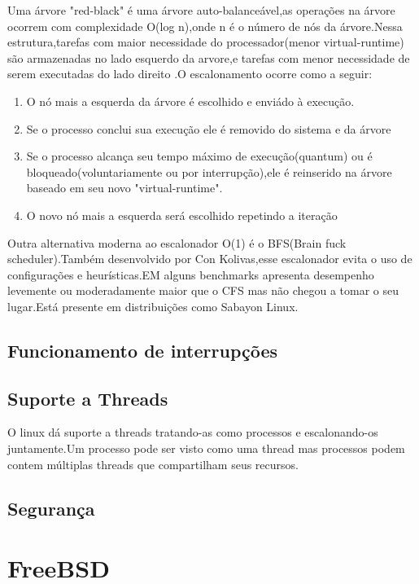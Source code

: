 \documentclass[conference]{IEEEtran}
\begin{document}
Uma árvore "red-black" é uma árvore auto-balanceável,as operações na árvore ocorrem com complexidade O(log n),onde n é o número de nós da árvore.Nessa estrutura,tarefas com maior necessidade do processador(menor virtual-runtime) são armazenadas no lado esquerdo da arvore,e tarefas com menor necessidade de serem executadas do lado direito \cite{LinuxSchedulerIBM}.O escalonamento ocorre como a seguir:
\begin{enumerate}
	\item O nó mais a esquerda da árvore é escolhido e enviádo à execução.
	\item Se o processo conclui sua execução ele é removido do sistema e da árvore
	\item Se o processo alcança seu tempo máximo de execução(quantum) ou é bloqueado(voluntariamente ou por interrupção),ele é reinserido na árvore baseado em seu novo "virtual-runtime".
	\item O novo nó mais a esquerda será escolhido repetindo a iteração\cite{LinuxSchedulerWiki}
\end{enumerate}



Outra alternativa moderna ao escalonador O(1) é o BFS(Brain fuck scheduler).Também desenvolvido por Con Kolivas,esse escalonador evita o uso de configurações e heurísticas.EM alguns benchmarks apresenta desempenho levemente ou moderadamente maior que o CFS mas não chegou a tomar o seu lugar.Está presente em distribuições como Sabayon Linux\cite{LinuxSchedulerBFS}.
\cite{LinuxSchedulerWiki}

\subsection{Funcionamento de interrupções}\label{sec:LinuxInt}

\subsection{Suporte a Threads}\label{sec:LinuxThreads}
O linux dá suporte a threads tratando-as como processos e escalonando-os juntamente.Um processo pode ser visto como uma thread mas
processos podem contem múltiplas threads que compartilham seus recursos\cite{LinuxSchedulerIBM}.
\subsection{Segurança}\label{sec:LinuxSec}

\section{FreeBSD}\label{sec:BSD}
\end{document}
